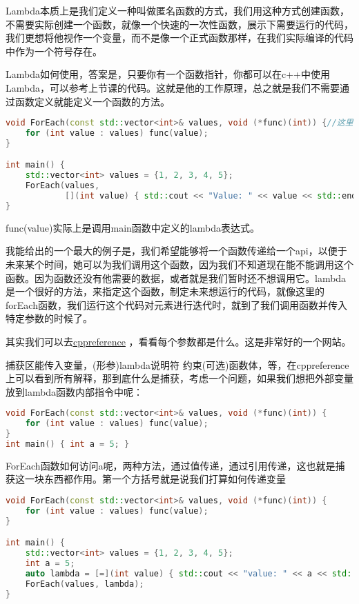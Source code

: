 Lambda本质上是我们定义一种叫做匿名函数的方式，我们用这种方式创建函数，不需要实际创建一个函数，就像一个快速的一次性函数，展示下需要运行的代码，我们更想将他视作一个变量，而不是像一个正式函数那样，在我们实际编译的代码中作为一个符号存在。

Lambda如何使用，答案是，只要你有一个函数指针，你都可以在c++中使用Lambda，可以参考上节课的代码。这就是他的工作原理，总之就是我们不需要通过函数定义就能定义一个函数的方法。

\begin{lstlisting}[language=c++]
void ForEach(const std::vector<int>& values, void (*func)(int)) {//这里的函数指针告诉我们lambda表达式需要做成什么样子，换句话说，我们知道返回void我们也知道接受一个int参数
    for (int value : values) func(value);
}

int main() {
    std::vector<int> values = {1, 2, 3, 4, 5};
    ForEach(values,
            [](int value) { std::cout << "Value: " << value << std::endl; });
}
\end{lstlisting}

{\ncodestyle func(value)}实际上是调用{\ncodestyle main}函数中定义的lambda表达式。

我能给出的一个最大的例子是，我们希望能够将一个函数传递给一个api，以便于未来某个时间，她可以为我们调用这个函数，因为我们不知道现在能不能调用这个函数。因为函数还没有他需要的数据，或者就是我们暂时还不想调用它。lambda是一个很好的方法，来指定这个函数，制定未来想运行的代码，就像这里的{\ncodestyle forEach}函数，我们运行这个代码对元素进行迭代时，就到了我们调用函数并传入特定参数的时候了。

其实我们可以去\href{https://zh.cppreference.com/w/首页}{cppreference} ，看看每个参数都是什么。这是非常好的一个网站。

捕获区能传入变量，{\ncodestyle [捕获](形参)lambda说明符 约束(可选){函数体}}，等，在cppreference上可以看到所有解释，那到底什么是捕获，考虑一个问题，如果我们想把外部变量放到lambda函数内部指令中呢：

\begin{lstlisting}[language=c++]
void ForEach(const std::vector<int>& values, void (*func)(int)) {
    for (int value : values) func(value);
}
int main() { int a = 5; }
\end{lstlisting}

{\ncodestyle ForEach}函数如何访问{\ncodestyle a}呢，两种方法，通过值传递，通过引用传递，这也就是捕获这一块东西都作用。第一个方括号就是说我们打算如何传递变量

\begin{lstlisting}[language=c++]
void ForEach(const std::vector<int>& values, void (*func)(int)) {
    for (int value : values) func(value);
}

int main() {
    std::vector<int> values = {1, 2, 3, 4, 5};
    int a = 5;
    auto lambda = [=](int value) { std::cout << "value: " << a << std::endl; };
    ForEach(values, lambda);
}
\end{lstlisting}

